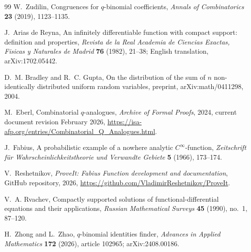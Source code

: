 \documentclass[11pt,a4paper,oneside,openany]{book}
\theoremstyle{definition}
\theoremstyle{remark}
\begin{document}
\begin{thebibliography}{99}
W.~Zudilin,
Congruences for $q$-binomial coefficients,
\emph{Annals of Combinatorics} \textbf{23} (2019), 1123--1135.

J.~Arias de Reyna,
An infinitely differentiable function with compact support: definition and properties,
\emph{Revista de la Real Academia de Ciencias Exactas, Fisicas y Naturales de Madrid} \textbf{76} (1982), 21--38;
English translation, arXiv:1702.05442.

D.~M. Bradley and R.~C. Gupta,
On the distribution of the sum of $n$ non-identically distributed uniform random variables,
preprint, arXiv:math/0411298, 2004.

M.~Eberl,
Combinatorial $q$-analogues,
\emph{Archive of Formal Proofs}, 2024, current document revision February 2026,
\url{https://isa-afp.org/entries/Combinatorial_Q_Analogues.html}.

J.~Fabius,
A probabilistic example of a nowhere analytic $C^\infty$-function,
\emph{Zeitschrift f\"ur Wahrscheinlichkeitstheorie und Verwandte Gebiete} \textbf{5} (1966), 173--174.

V.~Reshetnikov,
\emph{ProveIt: Fabius Function development and documentation},
GitHub repository, 2026,
\url{https://github.com/VladimirReshetnikov/ProveIt}.

V.~A. Rvachev,
Compactly supported solutions of functional-differential equations and their applications,
\emph{Russian Mathematical Surveys} \textbf{45} (1990), no.~1, 87--120.

H.~Zhong and L.~Zhao,
$q$-binomial identities finder,
\emph{Advances in Applied Mathematics} \textbf{172} (2026), article 102965;
arXiv:2408.00186.

\end{thebibliography}

\printindex
\end{document}
